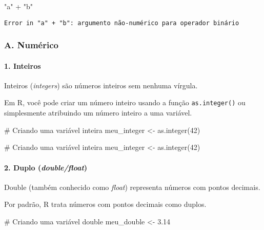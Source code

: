\documentclass[
  letterpaper,
  DIV=11,
  numbers=noendperiod]{scrartcl}
\let\oldparagraph\paragraph
\renewcommand{\paragraph}[1]{\oldparagraph{#1}\mbox{}}
\newenvironment{Shaded}{\begin{snugshade}}{\end{snugshade}}
\newcommand{\CommentTok}[1]{\textcolor[rgb]{0.37,0.37,0.37}{#1}}
\newcommand{\DecValTok}[1]{\textcolor[rgb]{0.68,0.00,0.00}{#1}}
\newcommand{\FloatTok}[1]{\textcolor[rgb]{0.68,0.00,0.00}{#1}}
\newcommand{\FunctionTok}[1]{\textcolor[rgb]{0.28,0.35,0.67}{#1}}
\newcommand{\NormalTok}[1]{\textcolor[rgb]{0.00,0.23,0.31}{#1}}
\newcommand{\OtherTok}[1]{\textcolor[rgb]{0.00,0.23,0.31}{#1}}
\newcommand{\SpecialCharTok}[1]{\textcolor[rgb]{0.37,0.37,0.37}{#1}}
\newcommand{\StringTok}[1]{\textcolor[rgb]{0.13,0.47,0.30}{#1}}
\begin{document}
\begin{Shaded}
\begin{Highlighting}[]
\StringTok{"a"} \SpecialCharTok{+} \StringTok{"b"}
\end{Highlighting}
\end{Shaded}

\begin{verbatim}
Error in "a" + "b": argumento não-numérico para operador binário
\end{verbatim}

\hypertarget{a.-numuxe9rico}{%
\subsubsection{A. Numérico}\label{a.-numuxe9rico}}

\hypertarget{inteiros}{%
\paragraph{1. Inteiros}\label{inteiros}}

Inteiros (\emph{integers}) são números inteiros sem nenhuma vírgula.

Em R, você pode criar um número inteiro usando a função
\texttt{as.integer()} ou simplesmente atribuindo um número inteiro a uma
variável.

\begin{Shaded}
\begin{Highlighting}[]
\CommentTok{\# Criando uma variável inteira}
\NormalTok{meu\_integer }\OtherTok{\textless{}{-}} \FunctionTok{as.integer}\NormalTok{(}\DecValTok{42}\NormalTok{)}

\CommentTok{\# Criando uma variável inteira}
\NormalTok{meu\_integer }\OtherTok{\textless{}{-}} \FunctionTok{as.integer}\NormalTok{(}\DecValTok{42}\NormalTok{)}
\end{Highlighting}
\end{Shaded}

\hypertarget{duplo-doublefloat}{%
\paragraph{\texorpdfstring{2. Duplo
(\emph{double/float})}{2. Duplo (double/float)}}\label{duplo-doublefloat}}

Double (também conhecido como \emph{float}) representa números com
pontos decimais.

Por padrão, R trata números com pontos decimais como duplos.

\begin{Shaded}
\begin{Highlighting}[]
\CommentTok{\# Criando uma variável double}
\NormalTok{meu\_double }\OtherTok{\textless{}{-}} \FloatTok{3.14}
\end{Highlighting}
\end{Shaded}
\end{document}
